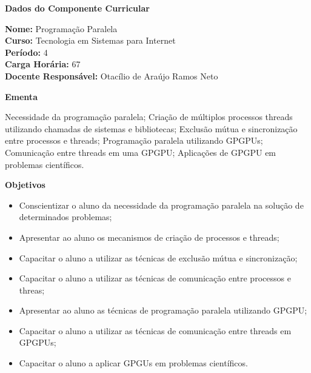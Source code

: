 

\begin{snugshade}\begin{center}\textbf{
	Dados do Componente Curricular
}\end{center}\end{snugshade}

\noindent 	\textbf{Nome:} Programação Paralela
\\ 			\textbf{Curso:} Tecnologia em Sistemas para Internet
\\ 			\textbf{Período:} \unit{4}{\degree}
\\ 			\textbf{Carga Horária:} \unit{67}{\hour}
\\ 			\textbf{Docente Responsável:} Otacílio de Araújo Ramos Neto


\begin{snugshade}\begin{center}\textbf{
    Ementa
\vphantom{q}}\end{center}\end{snugshade}

\noindent
Necessidade da programação paralela; Criação de múltiplos processos threads utilizando chamadas de sistemas e bibliotecas; Exclusão mútua e sincronização entre processos e threads; Programação paralela utilizando GPGPUs; Comunicação entre threads em uma GPGPU; Aplicações de GPGPU em problemas científicos.

\begin{snugshade}\begin{center}\textbf{
    Objetivos
}\end{center}\end{snugshade}

\begin{itemize}

\item Conscientizar o aluno da necessidade da programação paralela na solução de determinados problemas;
\item Apresentar ao aluno os mecanismos de criação de processos e threads;
\item Capacitar o aluno a utilizar as técnicas de exclusão mútua e sincronização;
\item Capacitar o aluno a utilizar as técnicas de comunicação entre processos e threas;
\item Apresentar ao aluno as técnicas de programação paralela utilizando GPGPU;
\item Capacitar o aluno a utilizar as técnicas de comunicação entre threads em GPGPUs;
\item Capacitar o aluno a aplicar GPGUs em problemas científicos.

\end{itemize} 

